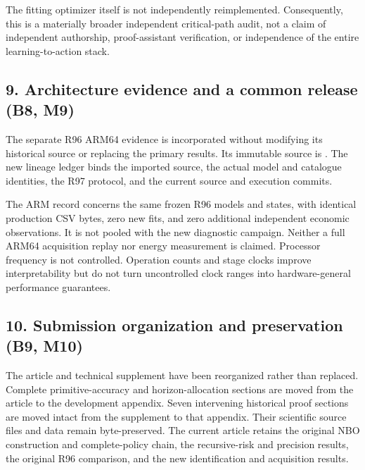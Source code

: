 The fitting optimizer itself is not independently reimplemented.
Consequently, this is a materially broader independent critical-path
audit, not a claim of independent authorship, proof-assistant
verification, or independence of the entire learning-to-action stack.

\hypertarget{architecture-evidence-and-a-common-release-b8-m9}{%
\subsection{9. Architecture evidence and a common release (B8,
M9)}\label{architecture-evidence-and-a-common-release-b8-m9}}

The separate R96 ARM64 evidence is incorporated without modifying its
historical source or replacing the primary results. Its immutable source
is . The new lineage
ledger binds the imported source, the actual model and catalogue
identities, the R97 protocol, and the current source and execution
commits.

The ARM record concerns the same frozen R96 models and states, with
identical production CSV bytes, zero new fits, and zero additional
independent economic observations. It is not pooled with the new
diagnostic campaign. Neither a full ARM64 acquisition replay nor energy
measurement is claimed. Processor frequency is not controlled. Operation
counts and stage clocks improve interpretability but do not turn
uncontrolled clock ranges into hardware-general performance guarantees.

\hypertarget{submission-organization-and-preservation-b9-m10}{%
\subsection{10. Submission organization and preservation (B9,
M10)}\label{submission-organization-and-preservation-b9-m10}}

The article and technical supplement have been reorganized rather than
replaced. Complete primitive-accuracy and horizon-allocation sections
are moved from the article to the development appendix. Seven
intervening historical proof sections are moved intact from the
supplement to that appendix. Their scientific source files and data
remain byte-preserved. The current article retains the original NBO
construction and complete-policy chain, the recursive-risk and precision
results, the original R96 comparison, and the new identification and
acquisition results.

